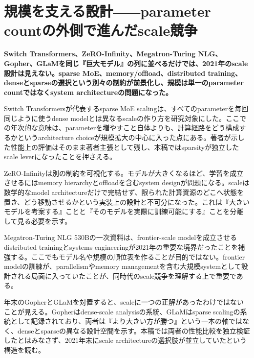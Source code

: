 \section{規模を支える設計――parameter countの外側で進んだscale競争}
\label{pkg:scale-sparse-systems}
\noindent\textbf{Switch Transformers、ZeRO-Infinity、Megatron-Turing NLG、Gopher、GLaMを同じ『巨大モデル』の列に並べるだけでは、2021年のscale設計は見えない。sparse MoE、memory/offload、distributed training、denseとsparseの選択という別々の制約が前景化し、規模は単一のparameter countではなくsystem architectureの問題になった。}\autocite{src-0028da50cfe5,src-7652e568e428,src-7b8be93e524d,src-7fa5b597ba1f,src-b307b4b82867,src-d15ca2441916}

Switch Transformersが代表するsparse MoE scalingは、すべてのparameterを毎回同じように使うdense modelとは異なるscaleの作り方を研究対象にした。ここでの年次的な意味は、parameterを増やすこと自体よりも、計算経路をどう構成するかというarchitecture choiceが規模拡大の中心に入った点にある。著者が示した性能上の評価はそのまま著者主張として残し、本稿ではsparsityが独立したscale leverになったことを押さえる。\autocite{src-7fa5b597ba1f}


ZeRO-Infinityは別の制約を可視化する。モデルが大きくなるほど、学習を成立させるにはmemory hierarchyとoffloadを含むsystem designが問題になる。scaleは数学的なmodel architectureだけで完結せず、限られた計算資源のどこへ状態を置き、どう移動させるかという実装上の設計と不可分になった。これは『大きいモデルを考案する』ことと『そのモデルを実際に訓練可能にする』ことを分離して見る必要を示す。\autocite{src-7b8be93e524d}


Megatron-Turing NLG 530Bの一次資料は、frontier-scale modelを成立させるdistributed trainingとsystems engineeringが2021年の重要な境界だったことを補強する。ここでもモデル名や規模の順位表を作ることが目的ではない。frontier modelの訓練が、parallelismやmemory managementを含む大規模systemとして設計される局面に入っていたことが、同時代のscale競争を理解する上で重要である。\autocite{src-b307b4b82867}


年末のGopherとGLaMを対置すると、scaleに一つの正解があったわけではないことが見える。Gopherはdense-scale analysisの系統、GLaMはsparse scalingの系統として記録されており、両者は『より大きい方が勝つ』という一本の軸ではなく、denseとsparseの異なる設計空間を示す。本稿では両者の性能比較を独立検証したとはみなさず、2021年末にscale architectureの選択肢が並立していたという構造を読む。\autocite{src-0028da50cfe5,src-7652e568e428,src-d15ca2441916}


